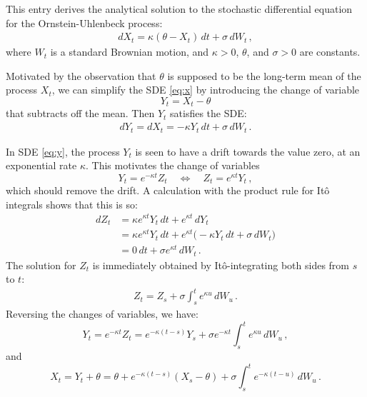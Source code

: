 \documentclass[12pt]{article}
\begin{document}
This entry derives
the analytical solution
to the stochastic differential equation
for the Ornstein-Uhlenbeck process:
\begin{align}\label{eq:x}
dX_t = \kappa ( \theta - X_t) \, dt + \sigma \, dW_t\,,
\end{align}
where $W_t$ is a standard Brownian motion,
and $\kappa > 0$, $\theta$, and $\sigma > 0$ are
constants.

Motivated by the observation
that $\theta$ is supposed to be the long-term mean
of the process $X_t$,
we can simplify the SDE \eqref{eq:x}
by introducing the change of variable 
\[
Y_t = X_t - \theta
\]
that subtracts off the mean.
Then $Y_t$ satisfies the SDE:
\begin{align}\label{eq:y}
dY_t = dX_t = -\kappa Y_t \, dt + \sigma \, dW_t\,.
\end{align}

In SDE \eqref{eq:y}, the process $Y_t$ is seen to have a drift
towards the value zero, at an exponential rate $\kappa$.  This motivates
the change of variables
\[
Y_t = e^{-\kappa t} Z_t \quad \Leftrightarrow \quad Z_t = e^{\kappa t} Y_t\,,
\]
which should remove the drift.
A calculation with the product rule for It\^o integrals
shows that this is so:
\begin{align*}
dZ_t &= \kappa e^{\kappa t} Y_t \, dt + e^{\kappa t} \, dY_t \\
&= \kappa e^{\kappa t} Y_t \, dt + 
e^{\kappa t} \bigl( -\kappa Y_t \, dt + \sigma \, dW_t \bigr) \\
&=
0 \, dt + \sigma e^{\kappa t} \, dW_t \,.
\end{align*}
The solution for $Z_t$ is immediately obtained 
by It\^o-integrating both sides from $s$ to $t$:
\begin{align*}
Z_t = Z_s + \sigma \int_s^t e^{\kappa u} \, dW_u\,.
\end{align*}
Reversing the changes of variables, we have:
\[
Y_t = e^{-\kappa t} Z_t =
e^{-\kappa (t-s)} Y_s
+ \sigma e^{-\kappa t} \int_s^t e^{\kappa u} \, dW_u\,,
\]
and
\[
X_t = Y_t + \theta = \theta + e^{-\kappa (t-s)} (X_s - \theta)
 + \sigma \int_s^t e^{-\kappa(t-u)} \, dW_u\,.
\]


\end{document}
